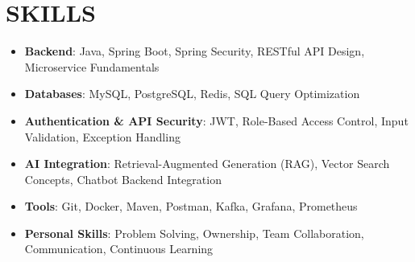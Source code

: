 \section{SKILLS}
\begin{itemize}[leftmargin=0in, label={}, itemsep=4pt, topsep=4pt, parsep=0pt, partopsep=0pt]
  \item \small\textbf{Backend}: Java, Spring Boot, Spring Security, RESTful API Design, Microservice Fundamentals
  \item \small\textbf{Databases}: MySQL, PostgreSQL, Redis, SQL Query Optimization
  \item \small\textbf{Authentication \& API Security}: JWT, Role-Based Access Control, Input Validation, Exception Handling
  \item \small\textbf{AI Integration}: Retrieval-Augmented Generation (RAG), Vector Search Concepts, Chatbot Backend Integration
  \item \small\textbf{Tools}: Git, Docker, Maven, Postman, Kafka, Grafana, Prometheus
  \item \small\textbf{Personal Skills}: Problem Solving, Ownership, Team Collaboration, Communication, Continuous Learning
\end{itemize}
